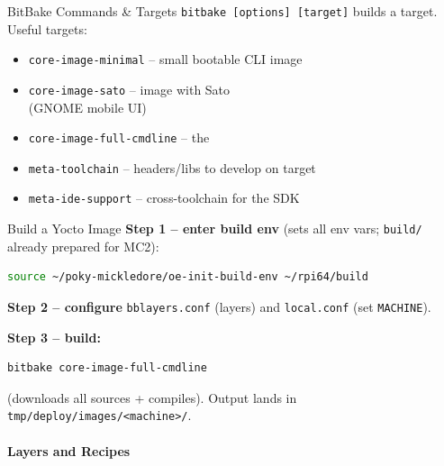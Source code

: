 \begin{definition}{BitBake Commands \& Targets}
    \texttt{bitbake [options] [target]} builds a target.
    Useful targets:

    \begin{itemize}
        \item \texttt{core-image-minimal} -- small bootable CLI image
        \item \texttt{core-image-sato} -- image with Sato \\ (GNOME mobile UI)
    \end{itemize}
    \begin{itemize}
        \item \texttt{core-image-full-cmdline} -- the 
        \item \texttt{meta-toolchain} -- headers/libs to develop on target
        \item \texttt{meta-ide-support} -- cross-toolchain for the SDK
    \end{itemize}
    \multend
\end{definition}

\begin{KR}{Build a Yocto Image}
    \textbf{Step 1 -- enter build env} (sets all env vars; \texttt{build/} already
    prepared for MC2):
\begin{lstlisting}[language=bash, style=basesmol, aboveskip=2pt, belowskip=2pt]
source ~/poky-mickledore/oe-init-build-env ~/rpi64/build
\end{lstlisting}
    \textbf{Step 2 -- configure} \texttt{bblayers.conf} (layers) and
    \texttt{local.conf} (set \texttt{MACHINE}).

    \textbf{Step 3 -- build:}
\begin{lstlisting}[language=bash, style=basesmol, aboveskip=2pt, belowskip=2pt]
bitbake core-image-full-cmdline
\end{lstlisting}
     (downloads all sources + compiles).
    Output lands in \texttt{tmp/deploy/images/<machine>/}.
\end{KR}

\paragraph{Layers and Recipes}

